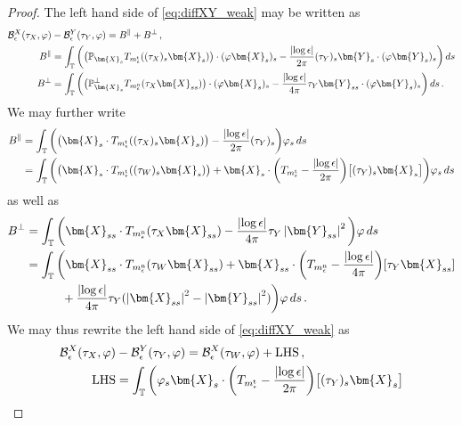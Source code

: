 \documentclass[11pt,reqno]{amsart}
\newcommand{\T}{\mathbb{T}}
\renewcommand{\P}{\mathbb{P}}
\newcommand{\X}{\bm{X}}
\newcommand{\Y}{\bm{Y}}
\newcommand{\abs}[1]{\left\lvert #1 \right\rvert}
\newcommand{\mc}[1]{\mathcal{#1}}
\numberwithin{equation}{section}
\theoremstyle{definition}
\begin{document}
\begin{proof}
The left hand side of \eqref{eq:diffXY_weak} may be written as 
\begin{equation}
\begin{aligned}
  \mc{B}_\epsilon^X(\tau_X,\varphi) &- \mc{B}_\epsilon^Y(\tau_Y,\varphi)= B^\parallel +B^\perp \,,\\
  B^\parallel &= \int_\T \bigg(\big(\P_{\X_s}T_{m_\epsilon^{\rm t}}((\tau_X)_s\X_s)\big)\cdot(\varphi\X_s)_s -\frac{\abs{\log\epsilon}}{2\pi}(\tau_Y)_s\Y_s\cdot(\varphi\Y_s)_s \bigg)\,ds \\
  B^\perp &= \int_\T \bigg( \big(\P_{\X_s}^\perp T_{m_\epsilon^{\rm n}}(\tau_X\X_{ss})\big)\cdot(\varphi\X_s)_s  -\frac{\abs{\log\epsilon}}{4\pi}\tau_Y\Y_{ss} \cdot(\varphi\Y_s)_s \bigg)\,ds\,.
\end{aligned}
\end{equation}
%
We may further write 
\begin{equation}
\begin{aligned}
  B^\parallel &= \int_\T \bigg(\big(\X_s\cdot T_{m_\epsilon^{\rm t}}((\tau_X)_s\X_s)\big) -\frac{\abs{\log\epsilon}}{2\pi}(\tau_Y)_s \bigg)\varphi_s\,ds \\
  &= \int_\T \bigg(\big(\X_s\cdot T_{m_\epsilon^{\rm t}}((\tau_W)_s\X_s)\big) + \X_s\cdot\bigg(T_{m_\epsilon^{\rm t}}-\frac{\abs{\log\epsilon}}{2\pi}\bigg)\big[(\tau_Y)_s\X_s\big] \bigg)\varphi_s\,ds
\end{aligned}
\end{equation}
as well as 
\begin{equation}
\begin{aligned}
 B^\perp &= \int_\T \bigg( \X_{ss}\cdot T_{m_\epsilon^{\rm n}}(\tau_X\X_{ss})  -\frac{\abs{\log\epsilon}}{4\pi}\tau_Y\abs{\Y_{ss}}^2 \bigg)\varphi\,ds \\
  &= \int_\T \bigg( \X_{ss}\cdot T_{m_\epsilon^{\rm n}}(\tau_W\X_{ss}) + \X_{ss}\cdot\bigg(T_{m_\epsilon^{\rm n}} -\frac{\abs{\log\epsilon}}{4\pi}\bigg)[\tau_Y\X_{ss}] \\
  &\qquad\quad + \frac{\abs{\log\epsilon}}{4\pi}\tau_Y(\abs{\X_{ss}}^2-\abs{\Y_{ss}}^2) \bigg)\varphi\,ds \,.
\end{aligned}
\end{equation}
%
We may thus rewrite the left hand side of \eqref{eq:diffXY_weak} as 
\begin{equation}
\begin{aligned}
  \mc{B}_\epsilon^X(\tau_X,\varphi) &- \mc{B}_\epsilon^Y(\tau_Y,\varphi)= \mc{B}_\epsilon^X(\tau_W,\varphi) + {\rm LHS}\,,\\
  {\rm LHS}&= \int_\T \bigg( \varphi_s\X_s\cdot\bigg(T_{m_\epsilon^{\rm t}}-\frac{\abs{\log\epsilon}}{2\pi}\bigg)\big[(\tau_Y)_s\X_s\big] \\

\end{aligned}
\end{equation}
\end{proof}
\end{document}
